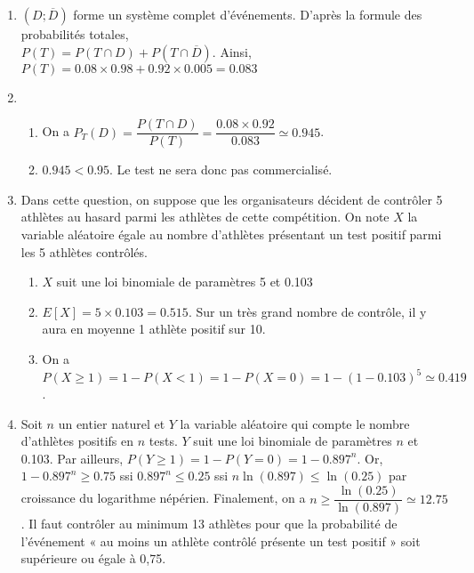 \documentclass[11pt,fleqn, openany]{book} %
\begin{document}
\begin{solution}
\begin{enumerate}
\item $(D;\overline{D})$ forme un système complet d'événements. D'après la formule des probabilités totales, \\$P(T)=P(T \cap D)+P(T \cap \overline{D})$. Ainsi, $P(T)=0.08 \times 0.98 + 0.92 \times 0.005 = 0.083$
\item \begin{enumerate}
\item On a $P_T(D)=\dfrac{P(T \cap D)}{P(T)}=\dfrac{0.08 \times 0.92}{0.083}\simeq 0.945$.
\item $0.945 < 0.95$. Le test ne sera donc pas commercialisé.
\end{enumerate}
\item Dans cette question, on suppose que les organisateurs décident de contrôler 5 athlètes au hasard parmi les athlètes de cette compétition. On note $X$ la variable aléatoire égale au nombre d'athlètes présentant un test
positif parmi les 5 athlètes contrôlés. 
\begin{enumerate}
\item $X$ suit une loi binomiale de paramètres 5 et 0.103
\item $E[X]=5 \times 0.103 = 0.515$. Sur un très grand nombre de contrôle, il y aura en moyenne 1 athlète positif sur 10.
\item On a $P(X \geqslant 1)=1-P(X<1)=1-P(X=0)=1-(1-0.103)^5\simeq 0.419$.
\end{enumerate} 
\item Soit $n$ un entier naturel et $Y$ la variable aléatoire qui compte le nombre d'athlètes positifs en $n$ tests. $Y$ suit une loi binomiale de paramètres $n$ et 0.103. Par ailleurs, $P(Y \geqslant 1)=1-P(Y=0)=1-0.897^n$. Or, $1-0.897^n \geqslant 0.75$ ssi $0.897^n \leqslant 0.25$ ssi $n \ln(0.897) \leqslant \ln(0.25)$ par croissance du logarithme népérien. Finalement, on a $n \geqslant \dfrac{\ln(0.25)}{\ln(0.897)}\simeq 12.75$. Il faut contrôler au minimum 13 athlètes pour que la probabilité de l'événement « au moins un athlète contrôlé présente un test positif » soit supérieure ou égale à 0,75.\end{enumerate}


\end{solution}
\end{document}
